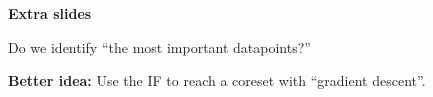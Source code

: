 
\begin{frame}{}
\begin{center}
    {\Huge \textbf{Extra slides}}
\end{center}
\end{frame}








\begin{frame}[t]{Do we identify ``the most important datapoints?''}

\textbf{Better idea:} Use the IF to reach a coreset with ``gradient descent''.\\[1em]


\end{frame}










